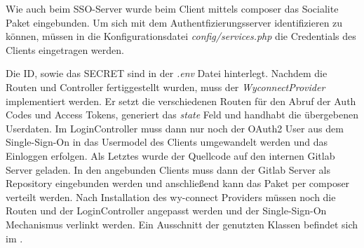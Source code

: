 Wie auch beim SSO-Server wurde beim Client mittels composer das Socialite Paket eingebunden. Um sich mit dem Authentfizierungsserver identifizieren zu können, müssen in die Konfigurationsdatei \textit{config/services.php} die Credentials des Clients eingetragen werden. 

Die ID, sowie das SECRET sind in der \textit{.env} Datei hinterlegt. Nachdem die Routen und Controller fertiggestellt wurden, muss der \textit{WyconnectProvider} implementiert werden. Er setzt die verschiedenen Routen für den Abruf der Auth Codes und Access Tokens, generiert das \textit{state} Feld und handhabt die übergebenen Userdaten. 
Im LoginController muss dann nur noch der OAuth2 User aus dem Single-Sign-On in das Usermodel des Clients umgewandelt werden und das Einloggen erfolgen. 
Als Letztes wurde der Quellcode auf den internen Gitlab Server geladen. In den angebunden Clients muss dann der Gitlab Server als Repository eingebunden werden und anschließend kann das Paket per composer verteilt werden. 
Nach Installation des wy-connect Providers müssen noch die Routen und der LoginController angepasst werden und der Single-Sign-On Mechanismus verlinkt werden. Ein Ausschnitt der genutzten Klassen befindet sich im .

